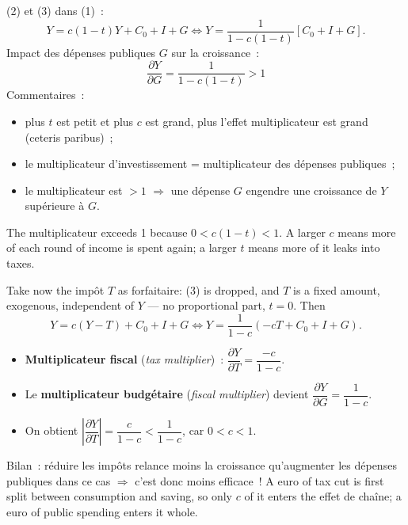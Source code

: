 (2) et (3) dans (1)~:
\[
  Y = c(1 - t)Y + C_0 + I + G
  \iff
  Y = \frac{1}{1 - c(1 - t)} \left[ C_0 + I + G \right].
\]
Impact des dépenses publiques $G$ sur la croissance~:
\[
  \boxed{\ \frac{\partial Y}{\partial G} = \frac{1}{1 - c(1 - t)} > 1\ }
\]
Commentaires~:
\begin{itemize}
  \item plus $t$ est petit et plus $c$ est grand, plus l'effet multiplicateur est
    grand (ceteris paribus)~;
  \item le multiplicateur d'investissement = multiplicateur des dépenses
    publiques~;
  \item le multiplicateur est $> 1$ $\Rightarrow$ une dépense $G$ engendre une
    croissance de $Y$ supérieure à $G$.
\end{itemize}
The multiplicateur exceeds 1 because $0 < c(1-t) < 1$. A larger $c$ means more of
each round of income is spent again; a larger $t$ means more of it leaks into
taxes.

\begin{example}
  Take now the impôt $T$ as forfaitaire: (3) is dropped, and $T$ is a fixed
  amount, exogenous, independent of $Y$ --- no proportional part, $t = 0$. Then
  \[
    Y = c(Y - T) + C_0 + I + G
    \iff
    Y = \frac{1}{1 - c}\left( -cT + C_0 + I + G \right).
  \]
  \begin{itemize}
    \item \textbf{Multiplicateur fiscal} (\textit{tax multiplier})~:
      $\dfrac{\partial Y}{\partial T} = \dfrac{-c}{1 - c}$.
    \item Le \textbf{multiplicateur budgétaire} (\textit{fiscal multiplier})
      devient $\dfrac{\partial Y}{\partial G} = \dfrac{1}{1 - c}$.
    \item On obtient $\left| \dfrac{\partial Y}{\partial T} \right|
      = \dfrac{c}{1 - c} < \dfrac{1}{1 - c}$, car $0 < c < 1$.
  \end{itemize}
  Bilan~: réduire les impôts relance moins la croissance qu'augmenter les
  dépenses publiques dans ce cas $\Rightarrow$ c'est donc moins efficace~! A euro
  of tax cut is first split between consumption and saving, so only $c$ of it
  enters the effet de chaîne; a euro of public spending enters it whole.
\end{example}


